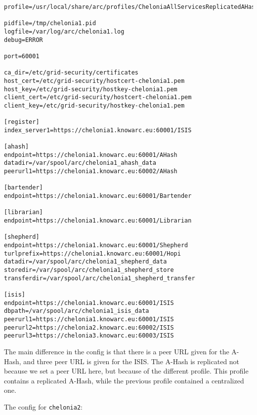 \documentclass{article}
\begin{document}
\begin{verbatim}
profile=/usr/local/share/arc/profiles/CheloniaAllServicesReplicatedAHashWithISIS.xml

pidfile=/tmp/chelonia1.pid
logfile=/var/log/arc/chelonia1.log
debug=ERROR

port=60001

ca_dir=/etc/grid-security/certificates
host_cert=/etc/grid-security/hostcert-chelonia1.pem
host_key=/etc/grid-security/hostkey-chelonia1.pem
client_cert=/etc/grid-security/hostcert-chelonia1.pem
client_key=/etc/grid-security/hostkey-chelonia1.pem

[register]
index_server1=https://chelonia1.knowarc.eu:60001/ISIS

[ahash]
endpoint=https://chelonia1.knowarc.eu:60001/AHash
datadir=/var/spool/arc/chelonia1_ahash_data
peerurl1=https://chelonia1.knowarc.eu:60002/AHash

[bartender]
endpoint=https://chelonia1.knowarc.eu:60001/Bartender

[librarian]
endpoint=https://chelonia1.knowarc.eu:60001/Librarian

[shepherd]
endpoint=https://chelonia1.knowarc.eu:60001/Shepherd
turlprefix=https://chelonia1.knowarc.eu:60001/Hopi
datadir=/var/spool/arc/chelonia1_shepherd_data
storedir=/var/spool/arc/chelonia1_shepherd_store
transferdir=/var/spool/arc/chelonia1_shepherd_transfer

[isis]
endpoint=https://chelonia1.knowarc.eu:60001/ISIS
dbpath=/var/spool/arc/chelonia1_isis_data
peerurl1=https://chelonia1.knowarc.eu:60001/ISIS
peerurl2=https://chelonia2.knowarc.eu:60002/ISIS
peerurl3=https://chelonia3.knowarc.eu:60003/ISIS
\end{verbatim}

The main difference in the config is that there is a peer URL given for the A-Hash, and three peer URL is given for the ISIS. The A-Hash is replicated not because we set a peer URL here, but because of the different profile. This profile contains a replicated A-Hash, while the previous profile contained a centralized one.

The config for \verb!chelonia2!:
\end{document}
